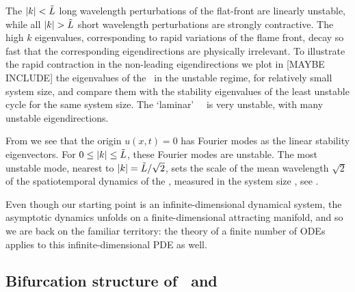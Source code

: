 The $|k|<\tilde{L}$
long wavelength perturbations of the flat-front {\eqv}
are linearly unstable, while all
$|k|> \tildeL$ short wavelength perturbations are strongly contractive.
The high $k$ eigenvalues, corresponding to rapid variations of
the flame front, decay so fast that the corresponding eigendirections
are physically irrelevant.
To illustrate the rapid contraction in the non-leading eigendirections
we plot  in [MAYBE INCLUDE] %
the eigenvalues of the \eqv\ in the unstable regime,
for relatively small system size, %
and compare them with the
stability eigenvalues of the least unstable cycle for the same
system size.
The `laminar' ~\eqv\ is very unstable,
with many unstable eigendirections.


From  we see that the origin $u(x,t) = 0$
has Fourier modes as the  linear
stability eigenvectors.
For $0 \leq |k| \leq \tilde{L}$, these Fourier modes are
unstable.
The most unstable mode, nearest to $|k|=\tilde{L}/\sqrt{2}$,
sets the scale of the mean wavelength $\sqrt{2}$
of the spatiotemporal dynamics of the {\KSe},
measured in the system size \tildeL, see .


%
%

Even though our starting point
is an infinite-dimensional dynamical system, the asymptotic dynamics
unfolds on a finite-dimensional attracting manifold, and so we are back on
the familiar territory:
the theory of a finite number of ODEs applies to this
infinite-dimensional PDE as well.

\subsection{Bifurcation structure of \eqva\ and \reqva}
\label{sec:KSlit}

